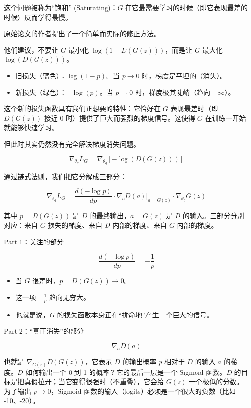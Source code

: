 这个问题被称为``饱和'' (Saturating)：\(G\) 在它最需要学习的时候（即它表现最差的时候）反而学得最慢。

原始论文的作者提出了一个简单而实际的修正方法。

他们建议，不要让 \(G\) 最小化 \(\log(1-D(G(z)))\)，而是让 \(G\) 最大化 \(\log(D(G(z)))\)。

\begin{itemize}
\tightlist
\item
  旧损失（蓝色）：\(\log(1-p)\)。当 \(p \rightarrow 0\) 时，梯度是平坦的（消失）。
\item
  新损失（绿色）：\(-\log(p)\)。当 \(p \rightarrow 0\) 时，梯度极其陡峭（趋向 \(-\infty\)）。
\end{itemize}

这个新的损失函数具有我们正想要的特性：它恰好在 \(G\) 表现最差时（即 \(D(G(z))\) 接近 0 时）提供了巨大而强烈的梯度信号。这使得 \(G\) 在训练一开始就能够快速学习。

但此时其实仍然没有完全解决梯度消失问题。

\[
\nabla_{\theta_g} L_G = \nabla_{\theta_g}[-\log(D(G(z)))]
\]

通过链式法则，我们把它分解成三部分：

\[
\nabla_{\theta_g} L_G =
\frac{d(-\log p)}{dp}
\cdot
\nabla_a D(a)\rvert_{a=G(z)}
\cdot
\nabla_{\theta_g} G(z)
\]

其中 \(p=D(G(z))\) 是 \(D\) 的最终输出，\(a=G(z)\) 是 \(D\) 的输入。三部分分别对应：来自 \(G\) 损失的梯度、来自 \(D\) 内部的梯度、来自 \(G\) 内部的梯度。

Part 1：关注的部分

\[
\frac{d(-\log p)}{dp}=-\frac{1}{p}
\]

\begin{itemize}
\tightlist
\item
  当 \(G\) 很差时，\(p=D(G(z)) \rightarrow 0\)。
\item
  这一项 \(-\frac{1}{p}\) 趋向无穷大。
\item
  也就是说，\(G\) 的损失函数本身正在``拼命地''产生一个巨大的信号。
\end{itemize}

Part 2：``真正消失''的部分

\[
\nabla_a D(a)
\]

也就是 \(\nabla_{G(z)}D(G(z))\)，它表示 \(D\) 的输出概率 \(p\) 相对于 \(D\) 的输入 \(a\) 的梯度。\(D\) 如何输出一个 0 到 1 的概率？它的最后一层是一个 Sigmoid 函数。\(D\) 的目标是把真假拉开；当它变得很强时（不重叠），它会给 \(G(z)\) 一个极低的分数。为了输出 \(p \rightarrow 0\)，Sigmoid 函数的输入（logits）必须是一个很大的负数（比如 -10、-20）。

